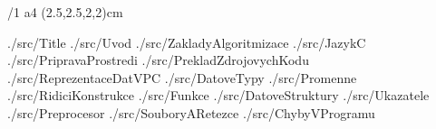 

\cslang
\typosize[12/16]
\margins/1 a4 (2.5,2.5,2,2)cm


\def\rootpath{./src/}
\def\imgpath{./img/}

 {\rootpath Title}
 {\rootpath Uvod}
 {\rootpath ZakladyAlgoritmizace}
 {\rootpath JazykC}
 {\rootpath PripravaProstredi}
 {\rootpath PrekladZdrojovychKodu}
 {\rootpath ReprezentaceDatVPC}
 {\rootpath DatoveTypy}
 {\rootpath Promenne}
 {\rootpath RidiciKonstrukce}
 {\rootpath Funkce}
 {\rootpath DatoveStruktury}
 {\rootpath Ukazatele}
 {\rootpath Preprocesor}
 {\rootpath SouboryARetezce}
 {\rootpath ChybyVProgramu}

\bye

